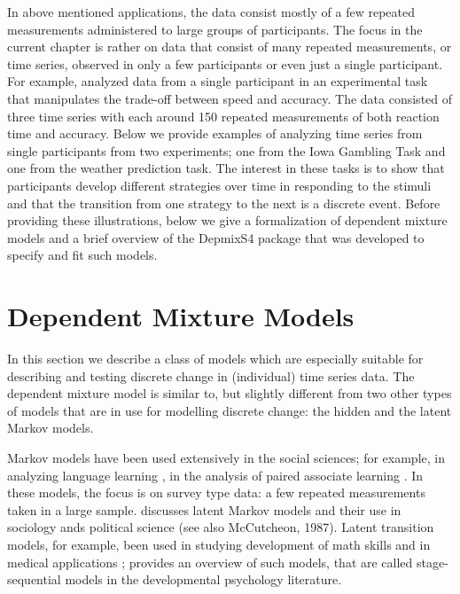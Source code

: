 \documentclass[a4paper,12pt,man]{apa} %
\newcommand{\citep}{\cite}
\newcommand{\citet}{\citeA}
\begin{document}
In above mentioned applications, the data consist mostly of a few
repeated measurements administered to large groups of participants.
The focus in the current chapter is rather on data that consist of
many repeated measurements, or time series, observed in only a few
participants or even just a single participant.  For example,
\citet{Visser2009} analyzed data from a single participant in an
experimental task that manipulates the trade-off between speed and
accuracy.  The data consisted of three time series with each around
150 repeated measurements of both reaction time and accuracy.  Below
we provide examples of analyzing time series from single participants
from two experiments; one from the Iowa Gambling Task and one from the
weather prediction task.  The interest in these tasks is to show that
participants develop different strategies over time in responding to
the stimuli and that the transition from one strategy to the next is a
discrete event.  Before providing these illustrations, below we give a
formalization of dependent mixture models and a brief overview of the
DepmixS4 package that was developed to specify and fit such models.


\section{Dependent Mixture Models}

In this section we describe a class of models which are especially
suitable for describing and testing discrete change in (individual)
time series data.  The dependent mixture model is similar to, but
slightly different from two other types of models that are in use for
modelling discrete change: the hidden and the latent Markov models.

Markov models have been used extensively in the social sciences; for
example, in analyzing language learning \cite{Miller1952,Miller1963},
in the analysis of paired associate learning \cite{Wickens1982}.  In
these models, the focus is on survey type data: a few repeated
measurements taken in a large sample.  
discusses latent Markov models and their use in sociology ands
political science (see also McCutcheon, 1987).  Latent transition
models, for example, been used in studying development of math skills
\citep{Collins1992} and in medical applications \citep{Reboussin1998};
\citet{Kaplan2008} provides an overview of such models, that are
called stage-sequential models in the developmental psychology
literature.
\end{document}
